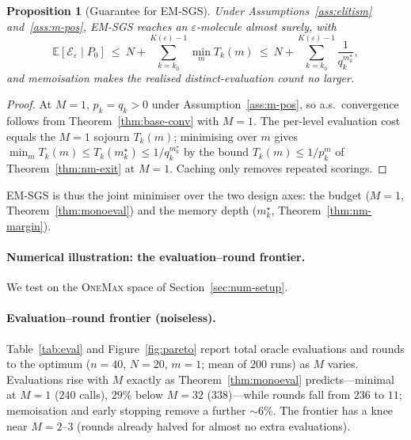 \documentclass[11pt,a4paper]{article}
\newtheorem{proposition}[theorem]{Proposition}
\newcommand{\E}{\mathbb{E}}
\newcommand{\evals}{\mathcal{E}}
\begin{document}
\begin{proposition}[Guarantee for EM-SGS]\label{prop:emsgs}
  Under Assumptions~\ref{ass:elitism} and~\ref{ass:m-pos}, EM-SGS reaches
  an $\varepsilon$-molecule almost surely, with
  \[
    \E[\evals_\varepsilon\mid P_0]
    \ \le\ N+\sum_{k=k_0}^{K(\varepsilon)-1}\min_m T_k(m)
    \ \le\ N+\sum_{k=k_0}^{K(\varepsilon)-1}\frac1{q_k^{m_k^\star}},
  \]
  and memoisation makes the realised distinct-evaluation count no larger.
\end{proposition}

\begin{proof}
  At $M=1$, $p_k=q_k>0$ under Assumption~\ref{ass:m-pos}, so a.s.\ convergence
  follows from Theorem~\ref{thm:base-conv} with $M=1$.  The per-level evaluation
  cost equals the $M=1$ sojourn $T_k(m)$; minimising over $m$ gives
  $\min_m T_k(m)\le T_k(m_k^\star)\le1/q_k^{m_k^\star}$ by the bound
  $T_k(m)\le1/p_k^m$ of Theorem~\ref{thm:nm-exit} at $M=1$.  Caching only removes
  repeated scorings.
\end{proof}

EM-SGS is thus the joint minimiser over the two design axes: the budget
($M=1$, Theorem~\ref{thm:monoeval}) and the memory depth ($m_k^\star$,
Theorem~\ref{thm:nm-margin}).

\paragraph{Numerical illustration: the evaluation--round frontier.}

We test on the \textsc{OneMax} space of Section~\ref{sec:num-setup}.

\paragraph{Evaluation--round frontier (noiseless).}
Table~\ref{tab:eval} and Figure~\ref{fig:pareto} report total oracle evaluations and
rounds to the optimum ($n=40$, $N=20$, $m=1$; mean of $200$ runs) as $M$
varies.  Evaluations rise with $M$ exactly as Theorem~\ref{thm:monoeval}
predicts---minimal at $M=1$ ($240$ calls), $29\%$ below $M=32$
($338$)---while rounds fall from $236$ to $11$; memoisation and early
stopping remove a further $\sim\!6\%$.  The frontier has a knee near
$M=2$--$3$ (rounds already halved for almost no extra evaluations).
\end{document}

